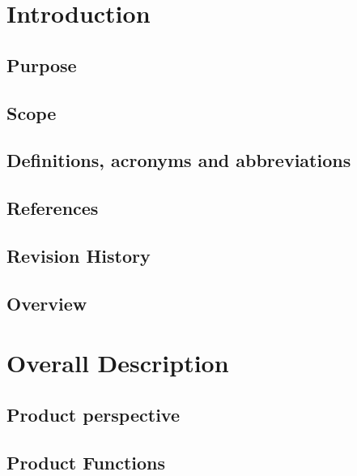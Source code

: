 


    
  \begin{titlepage}
    
  \end{titlepage}
  
  \tableofcontents
   
  \chapter{Introduction}
  \section{Purpose}
  
  \section{Scope}
  
  \section{Definitions, acronyms and abbreviations}
  
  \section{References}
  
  \section{Revision History}
  
  \section{Overview}
  
  
  \chapter{Overall Description}
  \section{Product perspective}
  
  \section{Product Functions}
  
